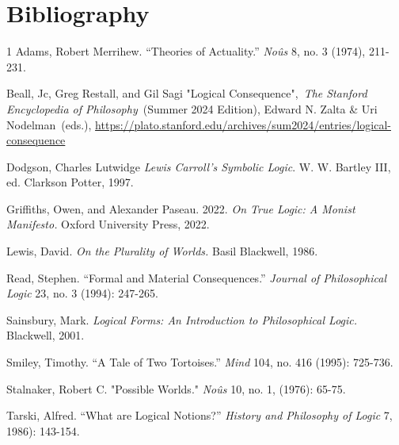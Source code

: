 \newpage  
\section*{Bibliography}


\begin{hangparas}{\hangingindent}{1}
Adams, Robert Merrihew. ``Theories of Actuality.'' \emph{Noûs} 8, no. 3
(1974), 211-231.

Beall, Jc, Greg Restall, and Gil Sagi "Logical Consequence",~\emph{The
Stanford Encyclopedia of Philosophy~}(Summer 2024 Edition), Edward N.
Zalta \& Uri Nodelman~(eds.),
\newline
\url{https://plato.stanford.edu/archives/sum2024/entries/logical-consequence}

Dodgson, Charles Lutwidge \emph{Lewis Carroll's Symbolic Logic}. W. W.
Bartley III, ed. Clarkson Potter, 1997.

Griffiths, Owen, and Alexander Paseau. 2022. \emph{On True Logic: A
Monist Manifesto.} Oxford University Press, 2022.

Lewis, David. \emph{On the Plurality of Worlds.} Basil Blackwell, 1986.

Read, Stephen. ``Formal and Material Consequences.'' \emph{Journal of Philosophical Logic} 23,
no. 3 (1994): 247-265.

Sainsbury, Mark. \emph{Logical Forms: An
Introduction to Philosophical Logic.} Blackwell, 2001.

Smiley, Timothy. ``A Tale of Two Tortoises.'' \emph{Mind} 104, no. 416 (1995):
725-736.

Stalnaker, Robert C. "Possible Worlds." \emph{Noûs} 10, no. 1, (1976): 65-75.

Tarski, Alfred. ``What are Logical Notions?''
\emph{History and Philosophy of Logic} 7, 1986): 143-154.
\end{hangparas}